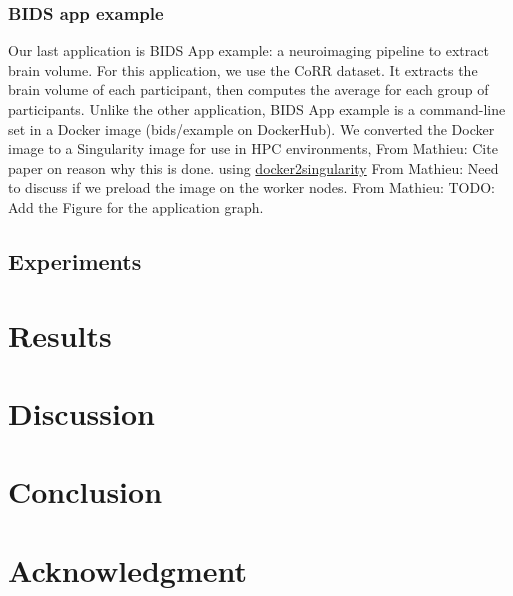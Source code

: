 \documentclass[conference]{IEEEtran}
\newcommand{\MD}[1]{\color{magenta}From Mathieu: #1 \color{black}}
\begin{document}
\subsubsection{BIDS app example}
Our last application is BIDS App example: a neuroimaging pipeline to extract brain volume.
For this application, we use the CoRR dataset.
It extracts the brain volume of each participant, then computes the average for each group of participants.
Unlike the other application, BIDS App example is a command-line set in a Docker image (bids/example on DockerHub).
We converted the Docker image to a Singularity image for use in HPC environments, \MD{Cite paper on reason why this is done.}
using \href{https://hub.docker.com/r/singularityware/docker2singularity/tags/}{docker2singularity}
\MD{Need to discuss if we preload the image on the worker nodes.}
\MD{TODO: Add the Figure for the application graph.}

\subsection{Experiments} %

\section{Results} %

\section{Discussion} %

\section{Conclusion} %

\section*{Acknowledgment} %




\end{document}
